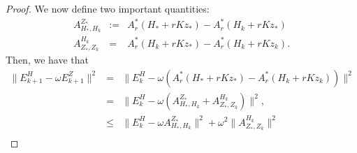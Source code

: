 \begin{itemize}
\begin{proof}
\begin{comment}
The trick is to multiply $-\omega$ for $E_{k+1}^Z$ error term and to obtain 
\begin{eqnarray*}
-\omega \left ( Kz_{*} - Kz_{k+1} \right ) = -\omega \left ( P_Z [ A_r^{*} (H_* + rK z_*) - A_r^{*} (H_k + rK z_k) ] \right ). 
\end{eqnarray*}
Lastly, for $H$, we have 
\begin{eqnarray*}
H_{*} - H_{k+1} &=& H_* - H_k + \omega ( -X_* + X_{k+1} + Kz_* - K z_{k+1} ) \\ 
&=& H_* - H_k - \omega [ X_* - X_{k+1} - (Kz_* - K z_{k+1}) ] \\  
&=& H_* - H_k - \omega [ A_r^{*} (H_* + r K z_*) - A_r^{*} (H_k + r K z_k) \\
&& - P_Z [ A_r^{*} (H_* + rK z_*) - A_r^{*} (H_k + rK z_k) ] ] \\
&=& H_* - H_k - \omega Q_Z (A_r^{*} (H_* + r K z_*) - A_r^{*} (H_k + r K z_k)) \\ 
&=& Q_Z [H_* - H_k - \omega (A_r^{*} (H_* + r K z_*) - A_r^{*} (H_k + r K z_k))] 
\end{eqnarray*}
Thus, we have that 
\begin{eqnarray*}
H_{*} - H_{k+1} - \omega (Kz_* - K z_{k+1}) = H_* - H_k - \omega (A_r^{*} (H_* + r K z_*) - A_r^{*} (H_k + r K z_k)). 
\end{eqnarray*}
\end{comment} 
We now define two important quantities: 
\begin{eqnarray}
A_{H_*,H_k}^{Z_*} &:=& A_r^{*} (H_* + rK z_*) - A_r^*(H_k + rKz_*) \\ 
A_{Z_*,Z_k}^{H_k} &=& A_r^*(H_k + rKz_*) - A_r^*(H_k + rKz_k). 
\end{eqnarray}
Then, we have that  
\begin{eqnarray*}
\|E_{k+1}^H - \omega E_{k+1}^Z\|^2 &=& \|E_k^H - \omega (A_r^{*} (H_* + r K z_*) - A_r^{*} (H_k + r K z_k))\|^2 \\ 
&=& \|E_k^H - \omega (A_{H_*,H_k}^{Z_*} + A_{Z_*,Z_k}^{H_k})\|^2,  \\
&\leq& \|E_k^H - \omega A_{H_*,H_k}^{Z_*}\|^2 + \omega^2 \|A_{Z_*,Z_k}^{H_k}\|^2 \\

\end{eqnarray*}
\end{proof}
\end{itemize}
